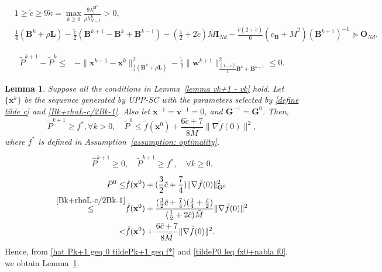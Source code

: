 \documentclass[10pt,a4paper]{amsart}
\newtheorem{lemma}{Lemma}
\begin{document}
	\begin{align}
		\label{define tilde c}& 1 \geq \tilde{c}\geq 9\tilde{\kappa}=\max_{k\geq 0}\frac{9\lambda_1^{\mathbf{B}^k}}{\rho \lambda_{N-1}^{\mathbf{L}}}>0, \\
		\label{Bk+rhoL-c/2Bk-1}& \frac{1}{4}(\mathbf{B}^k+\rho \mathbf{L})-\frac{\tilde{c}}{2}(\mathbf{B}^{k+1}-\mathbf{B}^k+\mathbf{B}^{k-1})\!-\!(\frac{1}{2}+2\tilde{c})\bar{M}\mathbf{I}_{Nd}-\frac{\tilde{c}(2+\tilde{c})}{6}(c_{\mathbf{B}}+\bar{M}^2)(\mathbf{B}^{k+1})^{-1} \succeq \mathbf{O}_{Nd}.
	\end{align}

	\begin{align}
		\tilde{P}^{k+1}-\tilde{P}^{k}\leq& -\|\mathbf{x}^{k+1}-\mathbf{x}^k\|^2_{\frac{1}{4}(\mathbf{B}^k+\rho \mathbf{L})}-\frac{\tilde{c}}{2} \|\mathbf{w}^{k+1}\|^2_{\frac{(1-\tilde{c})}{3}\mathbf{B}^k+\mathbf{B}^{k-1}}\leq 0.  \label{tildePk+1 - tildePk lemma}
	\end{align}

\begin{lemma}\label{lemma tildePk+1 geq f*}
	Suppose all the conditions in Lemma~\ref{lemma vk+1 - vk} hold. Let $\{\mathbf{x}^k\}$ be the sequence generated by UPP-SC with the parameters selected by \eqref{define tilde c} and \eqref{Bk+rhoL-c/2Bk-1}. Also let $\mathbf{x}^{-1}=\mathbf{v}^{-1}=0$, and $\mathbf{G}^{-1}=\mathbf{G}^0$. Then,
	\begin{equation*}
		\tilde{P}^{k+1}\geq f^*, \forall k >0, \quad \tilde{P}^{0}\leq \tilde{f}(\mathbf{x}^0)+\frac{6\tilde{c}+7}{8\bar{M}}\|\nabla \tilde{f}(0)\|^2,
	\end{equation*}
	where $f^*$ is defined in Assumption~\ref{assumption: optimality}.
\end{lemma}

\begin{equation}
	\hat{P}^{k+1}\geq 0, \quad \tilde{P}^{k+1}\geq f^*, \quad \forall k \geq 0. \label{hat Pk+1 geq 0 tildePk+1 geq f*}
\end{equation}

\begin{align}
	\tilde{P}^0\leq& \tilde{f}(\mathbf{x}^0)+ (\frac{3}{2}\tilde{c}+\frac{7}{4})\|\nabla \tilde{f}(0)\|^2_{\mathbf{G}^0}\notag\\
	\overset{\eqref{Bk+rhoL-c/2Bk-1}}{\leq} &\tilde{f}(\mathbf{x}^0) +\frac{(\frac{3}{2}\tilde{c}+\frac{7}{4})(\frac{1}{4}+\frac{\tilde{c}}{2})}{(\frac{1}{2}+2\tilde{c})\bar{M}}\|\nabla \tilde{f}(0)\|^2 \notag\\
	< & \tilde{f}(\mathbf{x}^0) +\frac{6\tilde{c}+7}{8\bar{M}}\|\nabla \tilde{f}(0)\|^2. \label{tildeP0 leq fx0+nabla f0}
\end{align}
Hence, from \eqref{hat Pk+1 geq 0 tildePk+1 geq f*} and \eqref{tildeP0 leq fx0+nabla f0}, we obtain Lemma~\ref{lemma tildePk+1 geq f*}.
\end{document}
